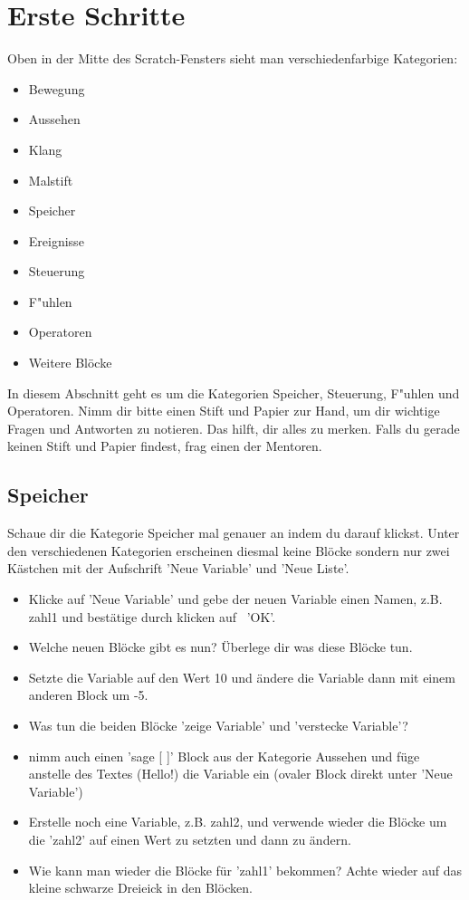 \documentclass{\VorlagenPfad/coderdojokatext}
\begin{document}
\section{Erste Schritte}
Oben in der Mitte des Scratch-Fensters sieht man verschiedenfarbige Kategorien:
\begin{itemize}
\item \textcolor{Bew}{Bewegung}
\item \textcolor{Aus}{Aussehen}
\item \textcolor{Kla}{Klang}
\item \textcolor{Mal}{Malstift}
\item \textcolor{Spe}{Speicher}
\item \textcolor{Ere}{Ereignisse}
\item \textcolor{Ste}{Steuerung}
\item \textcolor{Fue}{F"uhlen}
\item \textcolor{Ope}{Operatoren}
\item \textcolor{Wei}{Weitere Blöcke}
\end{itemize}

In diesem Abschnitt geht es um die Kategorien \textcolor{Spe}{Speicher}, \textcolor{Ste}{Steuerung}, \textcolor{Fue}{F"uhlen} und \textcolor{Ope}{Operatoren}. Nimm dir bitte einen Stift und Papier zur Hand, um dir wichtige Fragen und Antworten zu notieren. Das hilft, dir alles zu merken. Falls du gerade keinen Stift und Papier findest, frag einen der Mentoren.

\subsection{Speicher}
Schaue dir die Kategorie Speicher mal genauer an indem du darauf klickst. Unter den verschiedenen Kategorien erscheinen diesmal keine Blöcke sondern nur zwei Kästchen mit der Aufschrift 'Neue Variable' und 'Neue Liste'.
\begin{itemize}
\item Klicke auf 'Neue Variable' und gebe der neuen Variable einen Namen, z.B. zahl1 und bestätige durch klicken auf $\,$ 'OK'.
\item Welche neuen Blöcke gibt es nun? Überlege dir was diese Blöcke tun.
\item Setzte die Variable auf den Wert 10 und ändere die Variable dann mit einem anderen Block um -5.
\item Was tun die beiden Blöcke \textcolor{Spe}{'zeige Variable'} und \textcolor{Spe}{'verstecke Variable'}?
\item nimm auch einen \textcolor{Aus}{'sage [  ]'} Block aus der Kategorie \textcolor{Aus}{Aussehen} und füge anstelle des Textes (Hello!) die Variable ein (\textcolor{Spe}{ovaler Block} direkt unter 'Neue Variable')
\item Erstelle noch eine Variable, z.B. zahl2, und verwende wieder die Blöcke um die 'zahl2' auf einen Wert zu setzten und dann zu ändern.
\item Wie kann man wieder die Blöcke für 'zahl1' bekommen? Achte wieder auf das kleine schwarze Dreieick in den Blöcken.
\end{itemize}
\end{document}
